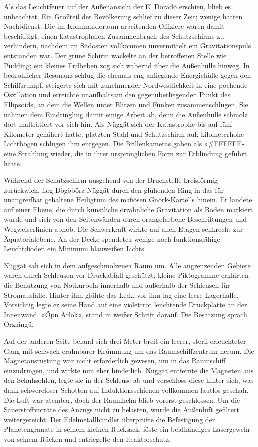Als das Leuchtfeuer auf der Außenansicht der El Dörädö erschien, blieb es unbeachtet. Ein Großteil der Bevölkerung schlief zu dieser Zeit; wenige hatten Nachtdienst. Die im Kommandoraum arbeitenden Offiziere waren damit beschäftigt, einen katastrophalen Zusammenbruch des Schutzschirms zu verhindern, nachdem im Südosten vollkommen unvermittelt ein Gravitationspuls entstanden war. Der grüne Schirm wackelte an der betroffenen Stelle wie Pudding; ein kleines Erdbeben zog sich wabernd über die Außenhülle hinweg. In bedrohlicher Resonanz schlug die ehemals eng anliegende Energiehülle gegen den Schiffsrumpf, steigerte sich mit zunehmender Nordwestlichkeit in eine pochende Oszillation und erreichte unaufhaltsam den gegenüberliegenden Punkt des Ellipsoids, an dem die Wellen unter Blitzen und Funken zusammenschlugen. Sie nahmen dem Eindringling damit einige Arbeit ab, denn die Außenhülle schmolz dort malträtiert vor sich hin. Als Nüggät sich der Katastrophe bis auf fünf Kilometer genähert hatte, platzten Stahl und Schutzschirm auf; kilometerhohe Lichtbögen schlugen ihm entgegen. Die Brillenkameras gaben als »\#FFFFFF« eine Strahlung wieder, die in ihrer ursprünglichen Form zur Erblindung geführt hätte.

Während der Schutzschirm ausgehend von der Bruchstelle kreisförmig zurückwich, flog Dögöbörz Nüggät durch den glühenden Ring in das für unangreifbar gehaltene Heiligtum des mafiösen Gnörk-Kartells hinein. Er landete auf einer Ebene, die durch künstliche örzähnliche Gravitation als Boden markiert wurde und sich von den Seitenwänden durch orangefarbene Beschriftungen und Wegweiserlinien abhob. Die Schwerkraft wirkte auf allen Etagen senkrecht zur Äquatorialebene. An der Decke spendeten wenige noch funktionsfähige Leuchtdioden ein Minimum blauweißen Lichts.

Nüggät sah sich in dem aufgeschmolzenen Raum um. Alle angrenzenden Gebiete waren durch Schleusen vor Druckabfall geschützt; kleine Piktogramme erklärten die Benutzung von Notkurbeln innerhalb und außerhalb der Schleusen für Stromausfälle. Hinter ihm glühte das Leck, vor ihm lag eine leere Lagerhalle. Vorsichtig legte er seine Hand auf eine violettrot leuchtende Druckplatte an der Innenwand. »Öpn Ärlök«, stand in weißer Schrift darauf. Die Besatzung sprach Örzlängü.

Auf der anderen Seite befand sich drei Meter breit ein leerer, steril erleuchteter Gang mit schwach erahnbarer Krümmung um das Raumschiffzentrum herum. Die Magnetausrüstung war nicht erforderlich gewesen, um in das Raumschiff einzudringen, und wirkte nun eher hinderlich. Nüggät entfernte die Magneten aus den Schuhsohlen, legte sie in der Schleuse ab und verschloss diese hinter sich, was dank schwereloser Schotten auf Induktionsschienen vollkommen lautlos geschah. Die Luft war atembar, doch der Raumhelm blieb vorerst geschlossen. Um die Sauerstoffvorräte des Anzugs nicht zu belasten, wurde die Außenluft gefiltert weitergereicht. Der Edelmetallhändler überprüfte die Befestigung der Planetengranate in seinem kleinen Rucksack, löste ein beidhändiges Lasergewehr von seinem Rücken und entriegelte den Reaktorschutz.

